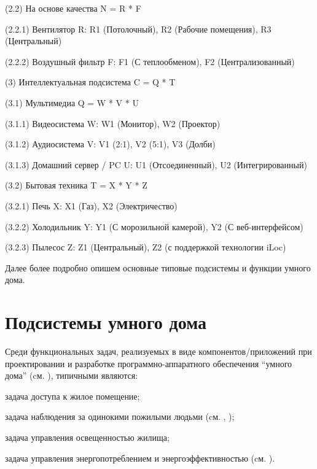 (2.2) На основе качества N = R * F

(2.2.1) Вентилятор R: R1 (Потолочный), R2 (Рабочие помещения), R3 (Центральный)

(2.2.2) Воздушный фильтр F: F1 (С теплообменом), F2 (Централизованный)

(3) Интеллектуальная подсистема C = Q * T

(3.1) Мультимедиа Q = W * V * U

(3.1.1) Видеосистема W: W1 (Монитор), W2 (Проектор)

(3.1.2) Аудиосистема V: V1 (2:1), V2 (5:1), V3 (Долби)

(3.1.3) Домашний сервер / PC U: U1 (Отсоединенный), U2 (Интегрированный)

(3.2) Бытовая техника T = X * Y * Z

(3.2.1) Печь X: X1 (Газ), X2 (Электричество)

(3.2.2) Холодильник Y: Y1 (С морозильной камерой), Y2 (С веб-интерфейсом)

(3.2.3) Пылесос Z: Z1 (Центральный), Z2 (с поддержкой технологии iLoc)


Далее более подробно опишем основные типовые подсистемы и функции умного дома.

\section{Подсистемы умного дома}
\label{sec_SH_subsystems}

Среди функциональных задач, реализуемых в виде компонентов/приложений при проектировании и разработке программно-аппаратного обеспечения ``умного дома'' (cм. ), типичными являются:

\begin{textitemize}
	\item задача доступа к жилое помещение;
	\item задача наблюдения за одинокими пожилыми людьми (cм. , );
	\item задача управления освещенностью жилища;
	\item задача управления энергопотреблением и энергоэффективностью (cм. ).
\end{textitemize}

